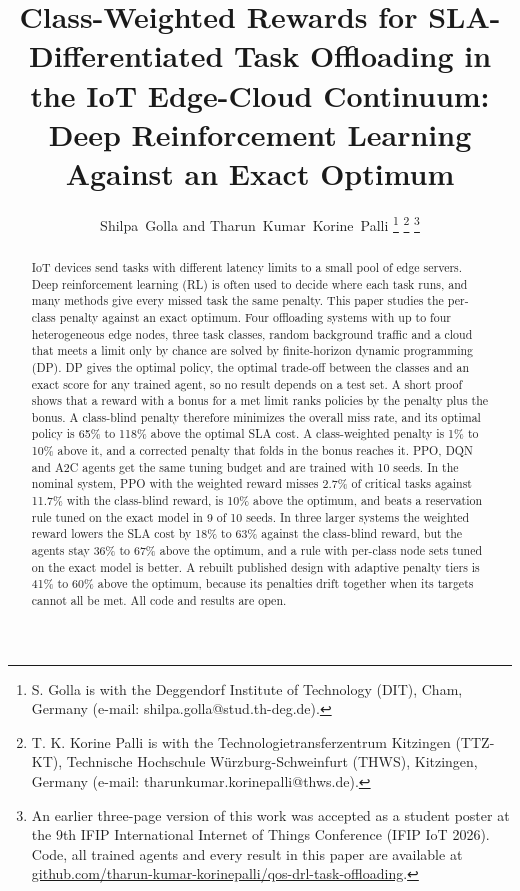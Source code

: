 \documentclass[journal]{IEEEtran}
\begin{document}
\title{Class-Weighted Rewards for SLA-Differentiated Task Offloading in the IoT Edge-Cloud Continuum: Deep Reinforcement Learning Against an Exact Optimum}

\author{Shilpa~Golla and Tharun~Kumar~Korine~Palli%
\thanks{S. Golla is with the Deggendorf Institute of Technology (DIT), Cham, Germany (e-mail: shilpa.golla@stud.th-deg.de).}%
\thanks{T. K. Korine Palli is with the Technologietransferzentrum Kitzingen (TTZ-KT), Technische Hochschule W\"urzburg-Schweinfurt (THWS), Kitzingen, Germany (e-mail: tharunkumar.korinepalli@thws.de).}%
\thanks{An earlier three-page version of this work was accepted as a student poster at the 9th IFIP International Internet of Things Conference (IFIP IoT 2026). Code, all trained agents and every result in this paper are available at \href{https://github.com/tharun-kumar-korinepalli/qos-drl-task-offloading}{github.com/tharun-kumar-korinepalli/qos-drl-task-offloading}.}}


\maketitle

\begin{abstract}
IoT devices send tasks with different latency limits to a small pool of edge servers. Deep reinforcement learning (RL) is often used to decide where each task runs, and many methods give every missed task the same penalty. This paper studies the per-class penalty against an exact optimum. Four offloading systems with up to four heterogeneous edge nodes, three task classes, random background traffic and a cloud that meets a limit only by chance are solved by finite-horizon dynamic programming (DP). DP gives the optimal policy, the optimal trade-off between the classes and an exact score for any trained agent, so no result depends on a test set. A short proof shows that a reward with a bonus for a met limit ranks policies by the penalty plus the bonus. A class-blind penalty therefore minimizes the overall miss rate, and its optimal policy is 65\% to 118\% above the optimal SLA cost. A class-weighted penalty is 1\% to 10\% above it, and a corrected penalty that folds in the bonus reaches it. PPO, DQN and A2C agents get the same tuning budget and are trained with 10 seeds. In the nominal system, PPO with the weighted reward misses 2.7\% of critical tasks against 11.7\% with the class-blind reward, is 10\% above the optimum, and beats a reservation rule tuned on the exact model in 9 of 10 seeds. In three larger systems the weighted reward lowers the SLA cost by 18\% to 63\% against the class-blind reward, but the agents stay 36\% to 67\% above the optimum, and a rule with per-class node sets tuned on the exact model is better. A rebuilt published design with adaptive penalty tiers is 41\% to 60\% above the optimum, because its penalties drift together when its targets cannot all be met. All code and results are open.

\end{abstract}
\end{document}
